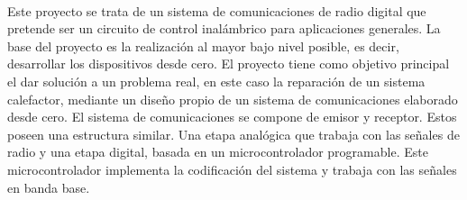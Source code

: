 \paragraph{}
Este proyecto se trata de un sistema de comunicaciones de radio digital que pretende ser un circuito de control inalámbrico para aplicaciones generales. 
La base del proyecto es la realización al mayor bajo nivel posible, es decir, desarrollar los dispositivos desde cero.
El proyecto tiene como objetivo principal el dar solución a un problema real, en este caso la reparación de un sistema calefactor, mediante un diseño propio de un sistema de comunicaciones elaborado desde cero.
El sistema de comunicaciones se compone de emisor y receptor. Estos poseen una estructura similar. Una etapa analógica que trabaja con las señales de radio y una etapa digital, basada en un microcontrolador programable. Este microcontrolador implementa la codificación del sistema y trabaja con las señales en banda base.
